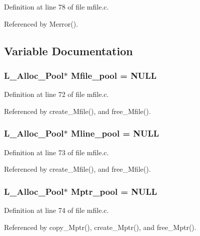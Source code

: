 Definition at line 78 of file mfile.c.

Referenced by Merror().

\subsection{Variable Documentation}
\subsubsection{\setlength{\rightskip}{0pt plus 5cm}\bf{L\_\-Alloc\_\-Pool}$\ast$ \bf{Mfile\_\-pool} = NULL}\label{mfile_8c_34fe8c10585e8ec69a209e452195fa80}




Definition at line 72 of file mfile.c.

Referenced by create\_\-Mfile(), and free\_\-Mfile().
\subsubsection{\setlength{\rightskip}{0pt plus 5cm}\bf{L\_\-Alloc\_\-Pool}$\ast$ \bf{Mline\_\-pool} = NULL}\label{mfile_8c_3af5625a492421cf10b0f3788ea61b0c}




Definition at line 73 of file mfile.c.

Referenced by create\_\-Mfile(), and free\_\-Mfile().
\subsubsection{\setlength{\rightskip}{0pt plus 5cm}\bf{L\_\-Alloc\_\-Pool}$\ast$ \bf{Mptr\_\-pool} = NULL}\label{mfile_8c_1516aa853d883bc45fa7834d030050f5}




Definition at line 74 of file mfile.c.

Referenced by copy\_\-Mptr(), create\_\-Mptr(), and free\_\-Mptr().